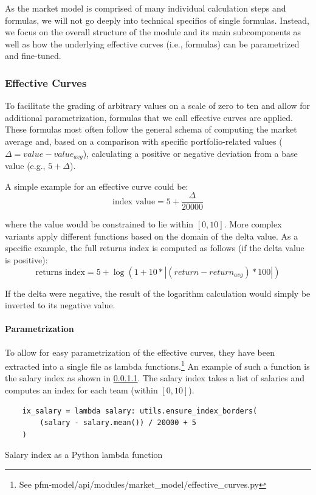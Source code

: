 As the market model is comprised of many individual calculation steps and formulas, we will not go deeply into technical specifics of single formulas. Instead, we focus on the overall structure of the module and its main subcomponents as well as how the underlying effective curves (i.e., formulas) can be parametrized and fine-tuned.

\subsubsection{Effective Curves}
To facilitate the grading of arbitrary values on a scale of zero to ten and allow for additional parametrization, formulas that we call effective curves are applied. These formulas most often follow the general schema of computing the market average and, based on a comparison with specific portfolio-related values (\(\Delta = value - value_{avg}\)), calculating a positive or negative deviation from a base value (e.g., \(5 + \Delta \)).

A simple example for an effective curve could be:
\[\text{index value} = 5 + \frac{\Delta}{20000}\]

where the value would be constrained to lie within \([0, 10]\). More complex variants apply different functions based on the domain of the delta value. As a specific example, the full returns index is computed as follows (if the delta value is positive):
\[\text{returns index} = 5 + \log(1 + 10 * |(return - return_{avg}) * 100|)\]

If the delta were negative, the result of the logarithm calculation would simply be inverted to its negative value.

\paragraph{Parametrization}
To allow for easy parametrization of the effective curves, they have been extracted into a single file as lambda functions.\footnote{See pfm-model/api/modules/market\_model/effective\_curves.py} An example of such a function is the salary index as shown in \cref{}. The salary index takes a list of salaries and computes an index for each team (within \([0, 10]\)).

\begin{listing}[h!]
    \begin{verbatim}
    ix_salary = lambda salary: utils.ensure_index_borders(
        (salary - salary.mean()) / 20000 + 5
    )
    \end{verbatim}
    \caption{Salary index as a Python lambda function}
    \label{lst:salary_lambda}
\end{listing}

